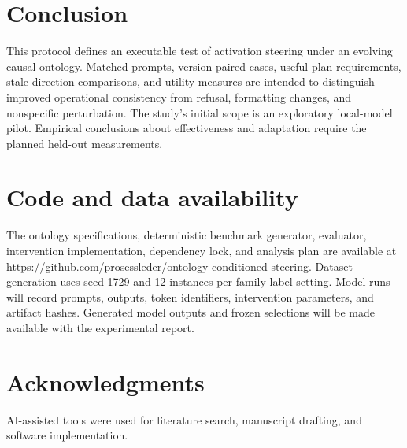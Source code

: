 \documentclass[preprint,12pt,numbers,nopreprintline]{elsarticle}
\begin{document}
\section{Conclusion}

This protocol defines an executable test of activation steering under an evolving causal ontology. Matched prompts, version-paired cases, useful-plan requirements, stale-direction comparisons, and utility measures are intended to distinguish improved operational consistency from refusal, formatting changes, and nonspecific perturbation. The study's initial scope is an exploratory local-model pilot. Empirical conclusions about effectiveness and adaptation require the planned held-out measurements.

\section*{Code and data availability}

The ontology specifications, deterministic benchmark generator, evaluator, intervention implementation, dependency lock, and analysis plan are available at \url{https://github.com/prosessleder/ontology-conditioned-steering}. Dataset generation uses seed 1729 and 12 instances per family-label setting. Model runs will record prompts, outputs, token identifiers, intervention parameters, and artifact hashes. Generated model outputs and frozen selections will be made available with the experimental report.

\section*{Acknowledgments}

AI-assisted tools were used for literature search, manuscript drafting, and software implementation.
\end{document}
